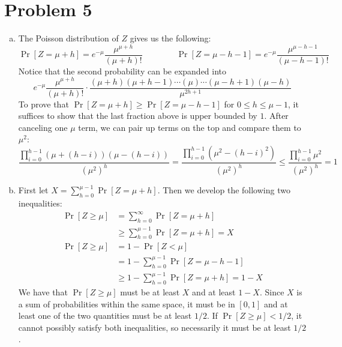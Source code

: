 \documentclass[11pt]{article}
\begin{document}
\section*{Problem 5}
\begin{enumerate}[(a)]
\item The Poisson distribution of $Z$ gives us the following:
$$\Pr[Z=\mu+h]=e^{-\mu}\frac{\mu^{\mu+h}}{(\mu+h)!}\qquad\qquad \Pr[Z=\mu-h-1]=e^{-\mu}\frac{\mu^{\mu-h-1}}{(\mu-h-1)!}$$
Notice that the second probability can be expanded into
$$e^{-\mu}\frac{\mu^{\mu+h}}{(\mu+h)!}\cdot \frac{(\mu+h)(\mu+h-1)\cdots(\mu)\cdots(\mu-h+1)(\mu-h)}{\mu^{2h+1}}$$
To prove that $\Pr[Z=\mu+h]\geq\Pr[Z=\mu-h-1]$ for $0\leq h\leq \mu-1$, it suffices to show that the last fraction above is upper bounded by $1$. After canceling one $\mu$ term, we can pair up terms on the top and compare them to $\mu^2$:
$$\frac{\prod_{i=0}^{h-1} (\mu+(h-i))(\mu-(h-i))}{(\mu^2)^h}= \frac{\prod_{i=0}^{h-1} (\mu^2-(h-i)^2)}{(\mu^2)^h}\leq \frac{\prod_{i=0}^{h-1} \mu^2}{(\mu^2)^h}=1$$
\item First let $X=\sum_{h=0}^{\mu-1}\Pr[Z=\mu+h]$. Then we develop the following two inequalities: \begin{align*}
\Pr[Z\geq\mu] &= \sum_{h=0}^{\infty}\Pr[Z=\mu+h]\\
&\geq \sum_{h=0}^{\mu-1}\Pr[Z=\mu+h] = X\\
\Pr[Z\geq\mu] &= 1-\Pr[Z<\mu]\\
&= 1-\sum_{h=0}^{\mu-1}\Pr[Z=\mu-h-1]\\
&\geq 1-\sum_{h=0}^{\mu-1}\Pr[Z=\mu+h] = 1-X
\end{align*}
We have that $\Pr[Z\geq\mu]$ must be at least $X$ and at least $1-X$. Since $X$ is a sum of probabilities within the same space, it must be in $[0,1]$ and at least one of the two quantities must be at least $1/2$. If $\Pr[Z\geq\mu]<1/2$, it cannot possibly satisfy both inequalities, so necessarily it must be at least $1/2$.
\end{enumerate}
\end{document}
